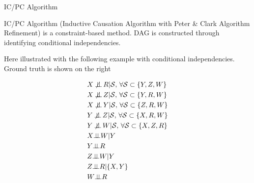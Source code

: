 \begin{point}
    IC/PC Algorithm
\end{point}

IC/PC Algorithm (Inductive Causation Algorithm with Peter \& Clark Algorithm Refinement) is a constraint-based method. DAG is constructed through identifying conditional independencies.

Here illustrated with the following example with conditional independencies. Ground truth is shown on the right 

\begin{center}
    \begin{minipage}{0.4\linewidth}
        \begin{align}
            &X \not\!\!\mathop{\independent} R |\mathcal{S},\,\forall \mathcal{S}\subset\{Y,Z,W\}\\
            &X \not\!\!\mathop{\independent} Z |\mathcal{S},\,\forall \mathcal{S}\subset\{Y,R,W\}\\
            &X \not\!\!\mathop{\independent} Y |\mathcal{S},\,\forall \mathcal{S}\subset\{Z,R,W\}\\
            &Y \not\!\!\mathop{\independent} Z |\mathcal{S},\,\forall \mathcal{S}\subset\{X,R,W\}\\
            &Y \not\!\!\mathop{\independent} W |\mathcal{S},\,\forall \mathcal{S}\subset\{X,Z,R\}\\
            &X\independent W|Y\\
            &Y\independent R\\
            &Z\independent W|Y\\
            &Z\independent R|\{X,Y\}\\
            &W\independent R
        \end{align}
    \end{minipage}
    \end{center}




